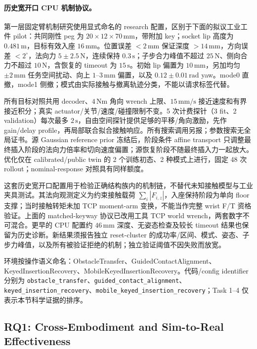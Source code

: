 \documentclass[11pt]{article}
\begin{document}
\paragraph{历史宽开口 CPU 机制协议。}
第一层固定臂机制研究使用显式命名的 research 配置，区别于下面的拟议工业工件 pilot：共同刚性 peg 为 $20\times12\times70\,\mathrm{mm}$，带附加 key；socket lip 高度为 $0.481\,\mathrm{m}$，目标有效入座 $16\,\mathrm{mm}$。位置误差 $<2\,\mathrm{mm}$ 保证深度 $>14\,\mathrm{mm}$，方向误差 $<2^\circ$，法向力 $5\pm2.5\,\mathrm N$，连续保持 $0.3\,\mathrm s$；子步合力峰值不超过 $25\,\mathrm N$、侧向合力不超过 $10\,\mathrm N$，含恢复的 timeout 为 $15\,\mathrm s$。初始 lip 偏置为 $10\,\mathrm{mm}$，另加均匀 $\pm2\,\mathrm{mm}$ 任务空间扰动、向上 $1$--$3\,\mathrm{mm}$ 偏置，以及 $0.12\pm0.01\,\mathrm{rad}$ yaw。mode0 直撤，mode1 侧撤；模式由实际接触与撤离轨迹分类，不能以请求标签代替。

所有目标对照共用 decoder、$4\,\mathrm{Nm}$ 角向 wrench 上限、$15\,\mathrm{mm/s}$ 接近速度和有界接近积分；真实 actuator/关节/速度/碰撞限制不变。5 次计费探针（3 fit、2 validation）每次最多 $2\,\mathrm s$，自由空间探针提供足够的平移/角向激励，先作 gain/delay profile，再局部联合拟合接触响应。所有搜索调用另报；参数搜索无全局证书。源 Gaussian reference prior 冻结后，阶段条件 affine transport 只调整最终插入阶段的法向力倍率和切向速度偏置；源恢复阶段不随最终插入力一起放大。优化仅在 calibrated/public twin 的 2 个训练初态、2 种模式上进行，固定 48 次 rollout；nominal-response 对照具有同样额度。

这套历史宽开口配置用于检验正确结构族内的机制链，不替代未知接触模型与工业夹具测试。其法向观测定义为约束接触载荷 $\sum_i|F_{i,z}|$，入座保持阶段为单向 floor 支撑；当时接触转矩未加 TCP moment-arm 变换，不能当作完整 wrist F/T 资格验证。上面的 matched-keyway 协议已改用工具 TCP world wrench，两套数字不可混合。更早的 CPU 配置约 $46\,\mathrm{mm}$ 深度、无姿态检查及较长 timeout 结果也保留为历史诊断。新结果须报告独立 reset-cluster 的成功率/区间、模式、姿态、子步力峰值，以及所有被验证拒绝的机制；独立验证阈值不因失败而放宽。

环境按操作语义命名：ObstacleTransfer、GuidedContactAlignment、KeyedInsertionRecovery、MobileKeyedInsertionRecovery。代码/config identifier 分别为 \texttt{obstacle\_transfer}、\texttt{guided\_contact\_alignment}、\texttt{keyed\_insertion\_recovery}、\texttt{mobile\_keyed\_insertion\_recovery}；Task 1--4 仅表示本节科学证据的排序。

\subsection{RQ1: Cross-Embodiment and Sim-to-Real Effectiveness}

\end{document}
